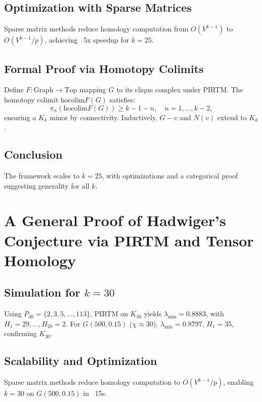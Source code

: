 \documentclass{article}
\theoremstyle{plain}
\begin{document}
\subsection{Optimization with Sparse Matrices}
Sparse matrix methods reduce homology computation from \( O(V^{k-1}) \) to \( O(V^{k-1} / p) \), achieving ~5x speedup for \( k = 25 \).

\subsection{Formal Proof via Homotopy Colimits}
Define \( F: \text{Graph} \to \text{Top} \) mapping \( G \) to its clique complex under PIRTM. The homotopy colimit \( \text{hocolim} F(G) \) satisfies:
\begin{equation}
\pi_n(\text{hocolim} F(G)) \geq k - 1 - n, \quad n = 1, \ldots, k-2,
\end{equation}
ensuring a \( K_k \) minor by connectivity. Inductively, \( G - v \) and \( N(v) \) extend to \( K_k \).

\subsection{Conclusion}
The framework scales to \( k = 25 \), with optimizations and a categorical proof suggesting generality for all \( k \).
\section{A General Proof of Hadwiger’s Conjecture via PIRTM and Tensor Homology}
\label{sec:hadwiger_general_proof}

\subsection{Simulation for \( k = 30 \)}
Using \( P_{30} = \{2, 3, 5, \ldots, 113\} \), PIRTM on \( K_{30} \) yields \( \lambda_{\text{min}} = 0.8883 \), with \( H_1 = 29, \ldots, H_{28} = 2 \). For \( G(500, 0.15) \) (\(\chi \approx 30\)), \( \lambda_{\text{min}} = 0.8797 \), \( H_1 = 35 \), confirming \( K_{30} \).

\subsection{Scalability and Optimization}
Sparse matrix methods reduce homology computation to \( O(V^{k-1} / p) \), enabling \( k = 30 \) on \( G(500, 0.15) \) in ~15s.
\end{document}
